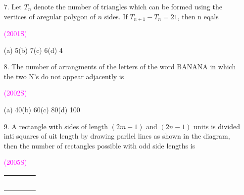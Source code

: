 \documentclass[journal,12pt,twocolumn]{IEEEtran}
\theoremstyle{remark}
\begin{document}
\begin{enumerate}
\begin{flushright}
    \textcolor{magenta}{(2000S)}
\end{flushright}
(a) 16\quad(b) 36\quad(c) 60\quad(d) 4
\item[7.]Let $T_n$ denote the number of triangles which can be formed using the vertices of aregular polygon of $n$ sides. If $T_{n+1}-T_n=21$, then n eqals\\
\begin{flushright}
    \textcolor{magenta}{(2001S)}
\end{flushright}
(a) 5\quad(b) 7\quad(c) 6\quad(d) 4
\item[8.]The number of arrangments of the letters of the word BANANA in which the two N's do not appear adjacently is\\
\begin{flushright}
    \textcolor{magenta}{(2002S)}
\end{flushright}
(a) 40\quad(b) 60\quad(c) 80\quad(d) 100
\item[9.]A rectangle with sides of length $(2m-1)$ and $(2n-1)$ units is divided inti squares of uit length by drawing parllel lines as shown in the diagram, then the number of rectangles possible with odd side lengths is\\
\begin{flushright}
    \textcolor{magenta}{(2005S)}
\end{flushright}
\begin{center}
\begin{tabular}{|c|c|c|c|}
\hline
\quad&\quad&\quad&\quad\\
\hline
\quad&\quad&\quad&\quad\\
\hline
\quad&\quad&\quad&\quad\\
\hline\quad&\quad&\quad&\quad\\
\hline\quad&\quad&\quad&\quad\\
\hline\quad&\quad&\quad&\quad\\
\hline
\end{tabular}
\end{center}







\end{enumerate}
\end{document}
